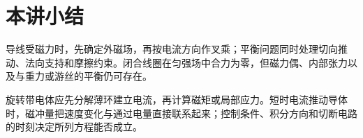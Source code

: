 \section{本讲小结}
导线受磁力时，先确定外磁场，再按电流方向作叉乘；平衡问题同时处理切向推动、法向支持和摩擦约束。闭合线圈在匀强场中合力为零，但磁力偶、内部张力以及与重力或游丝的平衡仍可存在。

旋转带电体应先分解薄环建立电流，再计算磁矩或局部应力。短时电流推动导体时，磁冲量把速度变化与通过电量直接联系起来；控制条件、积分方向和切断电路的时刻决定所列方程能否成立。
